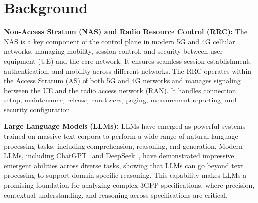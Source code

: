 \section{Background}


\noindent \textbf{Non-Access Stratum (NAS) and Radio Resource Control (RRC):} The NAS is a key component of the control plane in modern 5G and 4G cellular networks, managing mobility, session control, and security between user equipment (UE) and the core network. It ensures seamless session establishment, authentication, and mobility across different networks. The RRC operates within the Access Stratum (AS) of both 5G and 4G networks and manages signaling between the UE and the radio access network (RAN). It handles connection setup, maintenance, release, handovers, paging, measurement reporting, and security configuration.

\noindent \textbf{Large Language Models (LLMs):} LLMs have emerged as powerful systems trained on massive text corpora to perform a wide range of natural language processing tasks, including comprehension, reasoning, and generation. Modern LLMs, including ChatGPT~\cite{brown2020language} and DeepSeek~\cite{bi2024deepseek}, have demonstrated impressive emergent abilities across diverse tasks, showing that LLMs can go beyond text processing to support domain-specific reasoning.
This capability makes LLMs a promising foundation for analyzing complex 3GPP specifications, where precision, contextual understanding, and reasoning across specifications are critical. 

